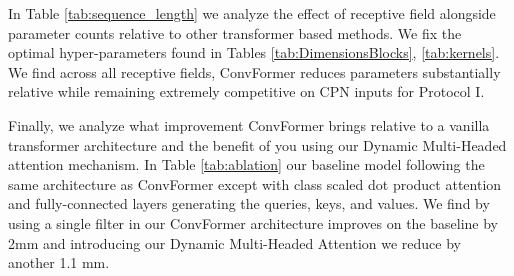 \documentclass{article}
\begin{document}
In Table \ref{tab:sequence_length} we analyze the effect of receptive field alongside parameter counts relative to other transformer based methods. We fix the optimal hyper-parameters found in Tables \ref{tab:DimensionsBlocks}, \ref{tab:kernels}. We find across all receptive fields, ConvFormer reduces parameters substantially relative \cite{li2022exploiting,ZZMYCD21} while remaining extremely competitive on CPN inputs for Protocol I. 

Finally, we analyze what improvement ConvFormer brings relative to a vanilla transformer architecture and the benefit of you using our Dynamic Multi-Headed attention mechanism. In Table \ref{tab:ablation} our baseline model following the same architecture as ConvFormer except with class scaled dot product attention and fully-connected layers generating the queries, keys, and values. We find by using a single filter in our ConvFormer architecture improves on the baseline by 2mm and introducing our Dynamic Multi-Headed Attention we reduce by another 1.1 mm. 





\begin{table*}[!htb]
    \centering
    \caption{\small Analysis of spatial embedding dimension and number of spatial and temporal ConvFormer Blocks. We also perform a limited analysis on number of attention heads. Optimal performance is marked by \textcolor{red}{Red} and assessed by MPJPE.}
    \label{tab:DimensionsBlocks}

\end{table*}
\end{document}
